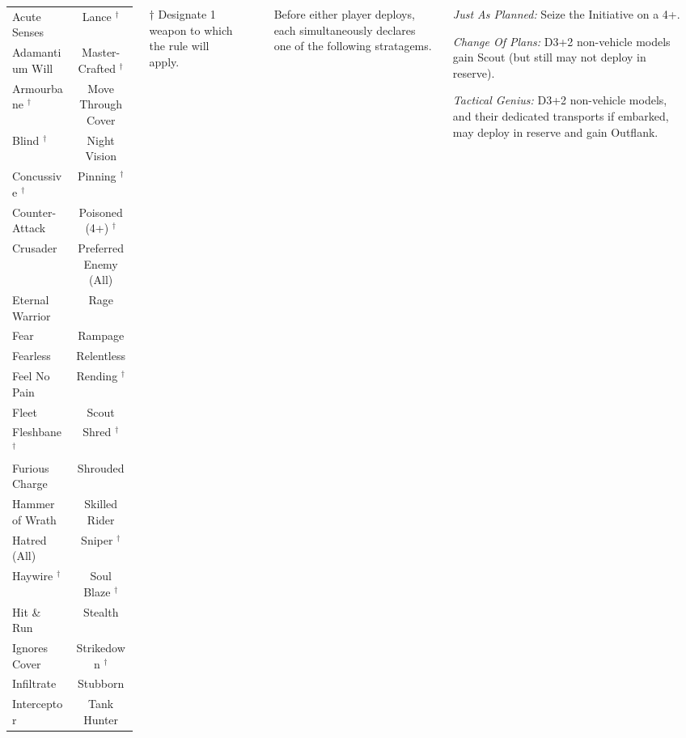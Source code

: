 \begin{columns}
\vspace*{6pt}
\hrule
\noindent\begin{tabular*}{\linewidth}{>{\centering}p{0.5\linewidth} c}
  Acute Senses & Lance $^\dagger$ \\
  Adamantium Will & Master-Crafted $^\dagger$ \\
  Armourbane $^\dagger$ & Move Through Cover \\
  Blind $^\dagger$ & Night Vision \\
  Concussive $^\dagger$ & Pinning $^\dagger$ \\
  Counter-Attack & Poisoned (4+) $^\dagger$ \\
  Crusader & Preferred Enemy (All) \\
  Eternal Warrior & Rage \\
  Fear & Rampage \\
  Fearless & Relentless \\
  Feel No Pain & Rending $^\dagger$ \\
  Fleet & Scout \\
  Fleshbane $^\dagger$ & Shred $^\dagger$ \\
  Furious Charge & Shrouded \\
  Hammer of Wrath & Skilled Rider \\
  Hatred (All) & Sniper $^\dagger$ \\ 
  Haywire $^\dagger$ & Soul Blaze $^\dagger$ \\
  Hit \& Run & Stealth \\
  Ignores Cover & Strikedown $^\dagger$ \\
  Infiltrate & Stubborn \\
  Interceptor & Tank Hunter \\ 
\end{tabular*}

\smallskip
\centerline{$\dagger$ Designate 1 weapon to which the rule will apply.}
\hrule

  Before either player deploys, each
simultaneously declares one of the following stratagems.

\begin{squishitemize}%
\item \emph{Just As Planned:} Seize the Initiative on a 4+.

\item \emph{Change Of Plans:} D3+2 non-vehicle models gain Scout (but
  still may not deploy in reserve).

\item \emph{Tactical Genius:} D3+2 non-vehicle models, and their
  dedicated transports if embarked, may deploy in reserve and gain
  Outflank.


\end{squishitemize}
\end{columns}
